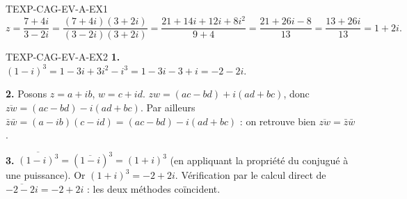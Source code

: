 \begin{corrige}{TEXP-CAG-EV-A-EX1}
\[
  z = \frac{7+4i}{3-2i} = \frac{(7+4i)(3+2i)}{(3-2i)(3+2i)} = \frac{21+14i+12i+8i^2}{9+4} = \frac{21+26i-8}{13} = \frac{13+26i}{13} = 1+2i.
\]
\end{corrige}

\begin{corrige}{TEXP-CAG-EV-A-EX2}
\textbf{1.} $(1-i)^3 = 1-3i+3i^2-i^3 = 1-3i-3+i = -2-2i$.

\textbf{2.} Posons $z=a+ib$, $w=c+id$. $zw=(ac-bd)+i(ad+bc)$, donc $\overline{zw}=(ac-bd)-i(ad+bc)$. Par ailleurs $\bar z\bar w=(a-ib)(c-id)=(ac-bd)-i(ad+bc)$ : on retrouve bien $\overline{zw}=\bar z\bar w$.

\textbf{3.} $\overline{(1-i)^3} = (\overline{1-i})^3 = (1+i)^3$ (en appliquant la propriété du conjugué à une puissance). Or $(1+i)^3 = -2+2i$. Vérification par le calcul direct de $\overline{-2-2i}=-2+2i$ : les deux méthodes coïncident.
\end{corrige}
